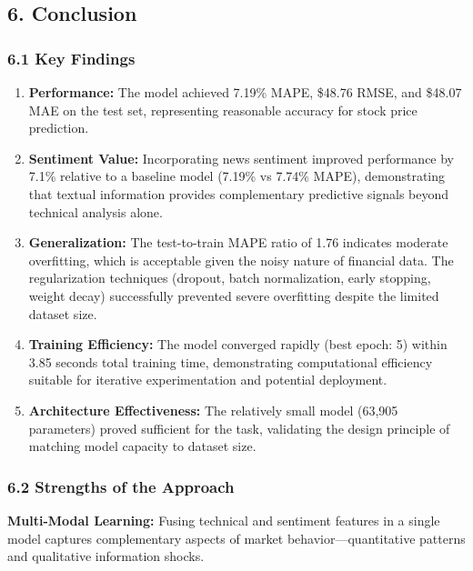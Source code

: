 \documentclass[
]{article}
\begin{document}
\subsection{6. Conclusion}\label{6-conclusion}

\subsubsection{6.1 Key Findings}\label{61-key-findings}

\begin{enumerate}
\def\labelenumi{\arabic{enumi}.}
\item
  \textbf{Performance:} The model achieved 7.19\% MAPE, \$48.76 RMSE,
  and \$48.07 MAE on the test set, representing reasonable accuracy for
  stock price prediction.
\item
  \textbf{Sentiment Value:} Incorporating news sentiment improved
  performance by 7.1\% relative to a baseline model (7.19\% vs 7.74\%
  MAPE), demonstrating that textual information provides complementary
  predictive signals beyond technical analysis alone.
\item
  \textbf{Generalization:} The test-to-train MAPE ratio of 1.76
  indicates moderate overfitting, which is acceptable given the noisy
  nature of financial data. The regularization techniques (dropout,
  batch normalization, early stopping, weight decay) successfully
  prevented severe overfitting despite the limited dataset size.
\item
  \textbf{Training Efficiency:} The model converged rapidly (best epoch:
  5) within 3.85 seconds total training time, demonstrating
  computational efficiency suitable for iterative experimentation and
  potential deployment.
\item
  \textbf{Architecture Effectiveness:} The relatively small model
  (63,905 parameters) proved sufficient for the task, validating the
  design principle of matching model capacity to dataset size.
\end{enumerate}

\subsubsection{6.2 Strengths of the
Approach}\label{62-strengths-of-the-approach}

\textbf{Multi-Modal Learning:} Fusing technical and sentiment features
in a single model captures complementary aspects of market
behavior---quantitative patterns and qualitative information shocks.
\end{document}
